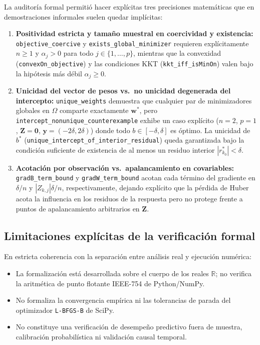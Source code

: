 La auditoría formal permitió hacer explícitas tres precisiones matemáticas que en demostraciones informales suelen quedar implícitas:
\begin{enumerate}
    \item \textbf{Positividad estricta y tamaño muestral en coercividad y existencia:} \texttt{objective\_coercive} y \texttt{exists\_global\_minimizer} requieren explícitamente $n \ge 1$ y $\alpha_j > 0$ para todo $j \in \{1,\dots,p\}$, mientras que la convexidad (\texttt{convexOn\_objective}) y las condiciones KKT (\texttt{kkt\_iff\_isMinOn}) valen bajo la hipótesis más débil $\alpha_j \ge 0$.
    \item \textbf{Unicidad del vector de pesos vs.\ no unicidad degenerada del intercepto:} \texttt{unique\_weights} demuestra que cualquier par de minimizadores globales en $\Omega$ comparte exactamente $\mathbf{w}^*$, pero \texttt{intercept\_nonunique\_counterexample} exhibe un caso explícito ($n=2$, $p=1$, $\mathbf{Z}=\mathbf{0}$, $\mathbf{y}=(-2\delta, 2\delta)$) donde todo $b \in [-\delta,\delta]$ es óptimo. La unicidad de $b^*$ (\texttt{unique\_intercept\_of\_interior\_residual}) queda garantizada bajo la condición suficiente de existencia de al menos un residuo interior $|r_{k_0}^*| < \delta$.
    \item \textbf{Acotación por observación vs.\ apalancamiento en covariables:} \texttt{gradB\_term\_bound} y \texttt{gradW\_term\_bound} acotan cada término del gradiente en $\delta/n$ y $|Z_{k,j}|\delta/n$, respectivamente, dejando explícito que la pérdida de Huber acota la influencia en los residuos de la respuesta pero no protege frente a puntos de apalancamiento arbitrarios en $\mathbf{Z}$.
\end{enumerate}

\subsection{Limitaciones explícitas de la verificación formal}

En estricta coherencia con la separación entre análisis real y ejecución numérica:
\begin{itemize}
    \item La formalización está desarrollada sobre el cuerpo de los reales $\mathbb{R}$; no verifica la aritmética de punto flotante IEEE-754 de Python/NumPy.
    \item No formaliza la convergencia empírica ni las tolerancias de parada del optimizador \texttt{L-BFGS-B} de SciPy.
    \item No constituye una verificación de desempeño predictivo fuera de muestra, calibración probabilística ni validación causal temporal.
\end{itemize}
